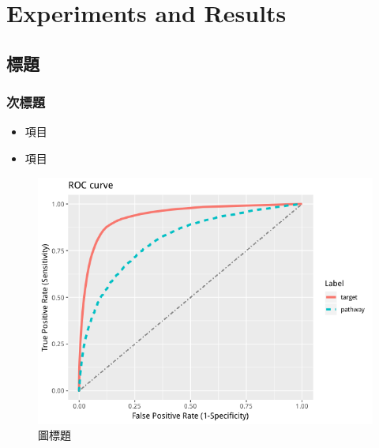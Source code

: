 \chapter{Experiments and Results}
\section{標題}

\subsection{次標題}

\begin{itemize}
\item 項目
\item 項目
\end{itemize}


\begin{figure}[H]
    \centering
    \includegraphics[scale=0.7]{figures/Fig1.png}%
    \caption{圖標題}
    \label{fig:fig_label}
\end{figure}



